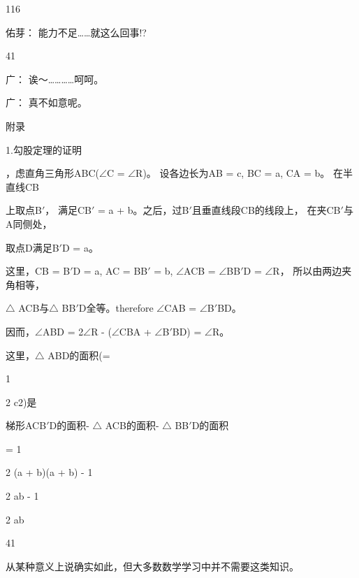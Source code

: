 116\par
佑芽： 能力不足……就这么回事!?\par
41\par
广： 诶～…………呵呵。\par
广： 真不如意呢。\par
附录\par
1.勾股定理的证明\par
，虑直角三角形ABC($\angle$C = $\angle$R)。 设各边长为AB = c, BC = a, CA = b。 在半直线CB\par
上取点B$\prime$， 满足CB$\prime$ = a + b。之后，过B$\prime$且垂直线段CB的线段上， 在夹CB$\prime$与A同侧处，\par
取点D满足B$\prime$D = a。\par
这里，CB = B$\prime$D = a, AC = BB$\prime$ = b, $\angle$ACB = $\angle$BB$\prime$D = $\angle$R， 所以由两边夹角相等，\par
$\triangle$ ACB与$\triangle$ BB$\prime$D全等。therefore $\angle$CAB = $\angle$B$\prime$BD。\par
因而，$\angle$ABD = 2$\angle$R - ($\angle$CBA + $\angle$B$\prime$BD) = $\angle$R。\par
这里，$\triangle$ ABD的面积(=\par
1\par
2 c2)是\par
梯形ACB$\prime$D的面积- $\triangle$ ACB的面积- $\triangle$ BB$\prime$D的面积\par
= 1\par
2 (a + b)(a + b) - 1\par
2 ab - 1\par
2 ab\par
41\par
从某种意义上说确实如此，但大多数数学学习中并不需要这类知识。\par

